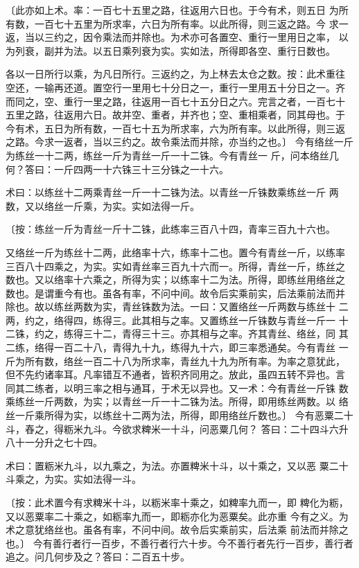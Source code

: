 \documentclass[a4paper,12pt,UTF8,twoside]{ctexbook}
\begin{document}
〔此亦如上术。率：一百七十五里之路，往返用六日也。于今有术，则五日 为所有数，一百七十五里为所求率，六日为所有率。以此所得，则三返之路。今 求一返，当以三约之，因令乘法而并除也。为术亦可各置空、重行一里用日之率， 以为列衰，副并为法。以五日乘列衰为实。实如法，所得即各空、重行日数也。

各以一日所行以乘，为凡日所行。三返约之，为上林去太仓之数。按：此术重往 空还，一输再还道。置空行一里用七十分日之一，重行一里用五十分日之一。齐 而同之，空、重行一里之路，往返用一百七十五分日之六。完言之者，一百七十 五里之路，往返用六日。故并空、重者，并齐也；空、重相乘者，同其母也。于 今有术，五日为所有数，一百七十五为所求率，六为所有率。以此所得，则三返 之路。今求一返者，当以三约之。故令乘法而并除，亦当约之也。〕 今有络丝一斤为练丝一十二两，练丝一斤为青丝一斤一十二铢。今有青丝一 斤，问本络丝几何？答曰：一斤四两一十六铢三十三分铢之一十六。

术曰：以练丝十二两乘青丝一斤一十二铢为法。以青丝一斤铢数乘练丝一斤 两数，又以络丝一斤乘，为实。实如法得一斤。

〔按：练丝一斤为青丝一斤十二铢，此练率三百八十四，青率三百九十六也。

又络丝一斤为练丝十二两，此络率十六，练率十二也。置今有青丝一斤，以练率 三百八十四乘之，为实。实如青丝率三百九十六而一。所得，青丝一斤，练丝之 数也。又以络率十六乘之，所得为实；以练率十二为法。所得，即练丝用络丝之 数也。是谓重今有也。虽各有率，不问中间。故令后实乘前实，后法乘前法而并 除也。故以练丝两数为实，青丝铢数为法。一曰：又置络丝一斤两数与练丝十 二两，约之，络得四，练得三。此其相与之率。又置练丝一斤铢数与青丝一斤一 十二铢，约之，练得三十二，青得三十三。亦其相与之率。齐其青丝、络丝，同 其二练，络得一百二十八，青得九十九，练得九十六，即三率悉通矣。今有青丝 一斤为所有数，络丝一百二十八为所求率，青丝九十九为所有率。为率之意犹此， 但不先约诸率耳。凡率错互不通者，皆积齐同用之。放此，虽四五转不异也。言 同其二练者，以明三率之相与通耳，于术无以异也。又一术：今有青丝一斤铢 数乘练丝一斤两数，为实；以青丝一斤一十二铢为法。所得，即用练丝两数。以 络丝一斤乘所得为实，以练丝十二两为法，所得，即用络丝斤数也。〕 今有恶粟二十斗，舂之，得粝米九斗。今欲求粺米一十斗，问恶粟几何？ 答曰：二十四斗六升八十一分升之七十四。

术曰：置粝米九斗，以九乘之，为法。亦置粺米十斗，以十乘之，又以恶 粟二十斗乘之，为实。实如法得一斗。

〔按：此术置今有求粺米十斗，以粝米率十乘之，如粺率九而一，即 粺化为粝，又以恶粟率二十乘之，如粝率九而一，即粝亦化为恶粟矣。此亦重 今有之义。为术之意犹络丝也。虽各有率，不问中间。故令后实乘前实，后法乘 前法而并除之也。〕 今有善行者行一百步，不善行者行六十步。今不善行者先行一百步，善行者 追之。问几何步及之？答曰：二百五十步。
\end{document}
